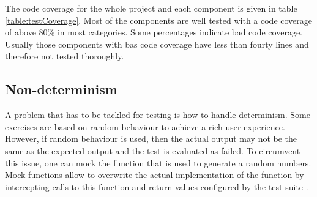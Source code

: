 The code coverage for the whole project and each component is given in table \ref{table:testCoverage}. Most of the components are well tested with a code coverage of above 80\% in most categories. Some percentages indicate bad code coverage. Usually those components with bas code coverage have less than fourty lines and therefore not tested thoroughly. 
 
\subsection*{Non-determinism}
A problem that has to be tackled for testing is how to handle determinism. Some exercises are based on random behaviour to achieve a rich user experience. However, if random behaviour is used, then the actual output may not be the same as the expected output and the test is evaluated as failed. To circumvent this issue, one can mock the function that is used to generate a random numbers. Mock functions allow to overwrite the actual implementation of the function by intercepting calls to this function and return values configured by the test suite \cite{Jest}. 

